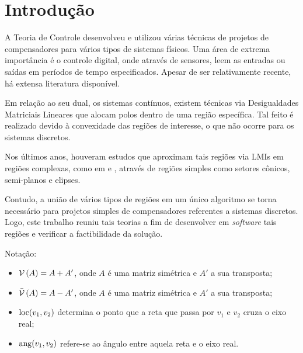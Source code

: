 \chapter{Introdução}
A Teoria de Controle desenvolveu e utilizou várias técnicas de projetos de compensadores para vários tipos de sistemas físicos. Uma área de extrema importância é o controle digital, onde através de sensores, leem as entradas ou saídas em períodos de tempo especificados. Apesar de ser relativamente recente, há extensa literatura disponível.

Em relação ao seu dual, os sistemas contínuos, existem técnicas via Desigualdades Matriciais Lineares que alocam polos dentro de uma região específica. Tal feito é realizado devido à convexidade das regiões de interesse, o que não ocorre para os sistemas discretos.

Nos últimos anos, houveram estudos que aproximam tais regiões via LMIs em regiões complexas, como em  e , através de regiões simples como setores cônicos, semi-planos e elipses.

Contudo, a união de vários tipos de regiões em um único algoritmo se torna necessário para projetos simples de compensadores referentes a sistemas discretos. Logo, este trabalho reuniu tais teorias a fim de desenvolver em \emph{software} tais regiões e verificar a factibilidade da solução.

Notação:
\begin{itemize}
\item $\operatorname{\mathcal{V}}{(A)} = A + A'$, onde $A$ é uma matriz simétrica e $A'$ a sua transposta;
\item $\operatorname{\mathcal{\bar{V}}}{(A)} = A - A'$, onde $A$ é uma matriz simétrica e $A'$ a sua transposta;
\item $\operatorname{loc}(v_1, v_2)$ determina o ponto que a reta que passa por $v_1$ e $v_2$ cruza o eixo real;
\item $\operatorname{ang}(v_1, v_2)$ refere-se ao ângulo entre aquela reta e o eixo real.
\end{itemize}